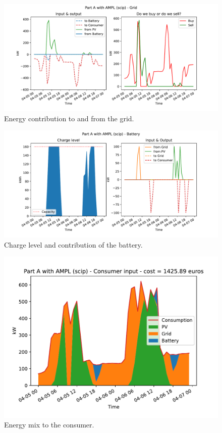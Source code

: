 \documentclass[12pt]{article}
\begin{document}
\begin{figure}[p]
    \centering
    \includegraphics[width=\textwidth]{figs/PartA/grid}
    \caption{Energy contribution to and from the grid.}
\end{figure}

\begin{figure}[p]
    \centering
    \includegraphics[width=\textwidth]{figs/PartA/battery}
    \caption{Charge level and contribution of the battery.}
    \label{fig:batteryA}
\end{figure}

\begin{figure}[p]
    \centering
    \includegraphics[width=\textwidth]{figs/PartA/consumer_input}
    \caption{Energy mix to the consumer.}
    \label{fig:solA}
\end{figure}
\end{document}
